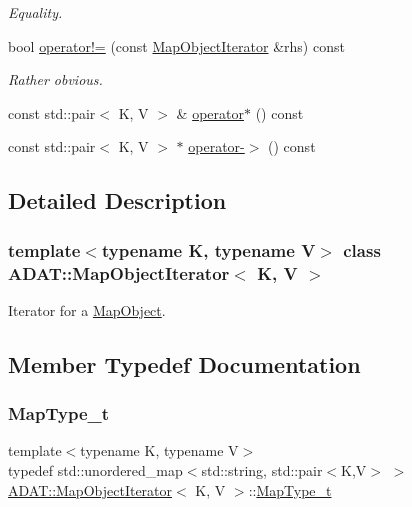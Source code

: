 \begin{DoxyCompactItemize}
\begin{DoxyCompactList}\small\item\em Equality. \end{DoxyCompactList}\item 
bool \mbox{\hyperlink{classADAT_1_1MapObjectIterator_a1110663c46b0e652d8ecd0dbe80bd255}{operator!=}} (const \mbox{\hyperlink{classADAT_1_1MapObjectIterator}{Map\+Object\+Iterator}} \&rhs) const
\begin{DoxyCompactList}\small\item\em Rather obvious. \end{DoxyCompactList}\item 
const std\+::pair$<$ K, V $>$ \& \mbox{\hyperlink{classADAT_1_1MapObjectIterator_a3faecdcae68181e91e40dad404296ed7}{operator$\ast$}} () const
\item 
const std\+::pair$<$ K, V $>$ $\ast$ \mbox{\hyperlink{classADAT_1_1MapObjectIterator_aa56a13020c9fac807f99312923610dbd}{operator-\/$>$}} () const
\end{DoxyCompactItemize}


\subsection{Detailed Description}
\subsubsection*{template$<$typename K, typename V$>$\newline
class A\+D\+A\+T\+::\+Map\+Object\+Iterator$<$ K, V $>$}

Iterator for a \mbox{\hyperlink{classADAT_1_1MapObject}{Map\+Object}}. 

\subsection{Member Typedef Documentation}
\mbox{\label{classADAT_1_1MapObjectIterator_ad159a70384669e35c10ddb298c4d1ba8}} 
\subsubsection{\texorpdfstring{MapType\_t}{MapType\_t}\hspace{0.1cm}{\footnotesize\ttfamily [1/3]}}
{\footnotesize\ttfamily template$<$typename K, typename V$>$ \\
typedef std\+::unordered\+\_\+map$<$std\+::string, std\+::pair$<$K,V$>$ $>$ \mbox{\hyperlink{classADAT_1_1MapObjectIterator}{A\+D\+A\+T\+::\+Map\+Object\+Iterator}}$<$ K, V $>$\+::\mbox{\hyperlink{classADAT_1_1MapObjectIterator_ad159a70384669e35c10ddb298c4d1ba8}{Map\+Type\+\_\+t}}}



